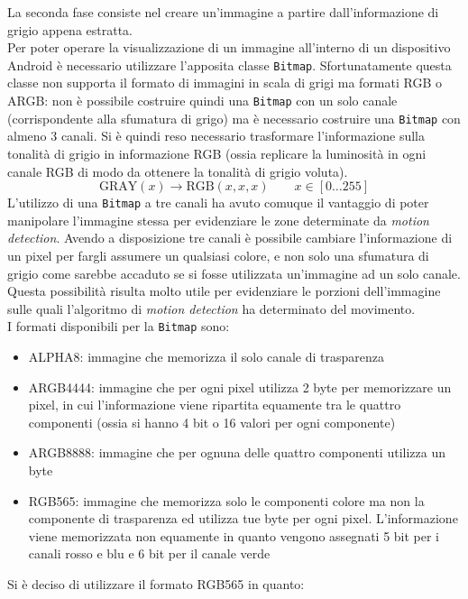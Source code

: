 La seconda fase consiste nel creare un'immagine a partire dall'informazione di grigio appena estratta.\\
Per poter operare la visualizzazione di un immagine all'interno di un dispositivo Android è necessario utilizzare l'apposita classe \texttt{Bitmap}. Sfortunatamente questa classe non supporta il formato di immagini in scala di grigi ma formati RGB o ARGB: non è possibile costruire quindi una \texttt{Bitmap} con un solo canale (corrispondente alla sfumatura di grigo) ma è necessario costruire una \texttt{Bitmap} con almeno 3 canali. Si è quindi reso necessario trasformare l'informazione sulla tonalità di grigio in informazione RGB (ossia replicare la luminosità in ogni canale RGB di modo da ottenere la tonalità di grigio voluta).
\[\text{GRAY}(x) \to \text{RGB}(x, x, x) \qquad x \in [0 \ldots 255] \]
L'utilizzo di una \texttt{Bitmap} a tre canali ha avuto comuque il vantaggio di poter manipolare l'immagine stessa per evidenziare le zone determinate da \textit{motion detection}. Avendo a disposizione tre canali è possibile cambiare l'informazione di un pixel per fargli assumere un qualsiasi colore, e non solo una sfumatura di grigio come sarebbe accaduto se si fosse utilizzata un'immagine ad un solo canale. Questa possibilità risulta molto utile per evidenziare le porzioni dell'immagine sulle quali l'algoritmo di \textit{motion detection} ha determinato del movimento.\\
I formati disponibili per la \texttt{Bitmap} sono:
\begin{itemize}
  \item ALPHA8: immagine che memorizza il solo canale di trasparenza
  \item ARGB4444: immagine che per ogni pixel utilizza 2 byte per memorizzare un pixel, in cui l'informazione viene ripartita equamente tra le quattro componenti (ossia si hanno 4 bit o 16 valori per ogni componente)
  \item ARGB8888: immagine che per ognuna delle quattro componenti utilizza un byte
  \item RGB565: immagine che memorizza solo le componenti colore ma non la componente di trasparenza ed utilizza tue byte per ogni pixel. L'informazione viene memorizzata non equamente in quanto vengono assegnati 5 bit per i canali rosso e blu e 6 bit per il canale verde
\end{itemize}
Si è deciso di utilizzare il formato RGB565 in quanto:
